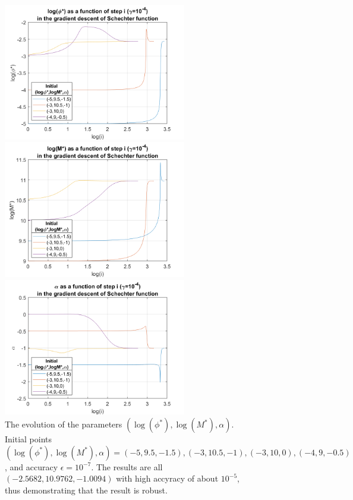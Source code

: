 \documentclass[12pt, graphicx]{article}
\begin{document}
\begin{figure}[ht]
\begin{minipage}{0.48\linewidth}
\centering
\includegraphics[width = 80mm]{phi.png}
\end{minipage}
\begin{minipage}{0.48\linewidth}
\centering
\includegraphics[width = 80mm]{m.png}
\end{minipage}
\centering
\begin{minipage}{0.48\linewidth}
\centering
\includegraphics[width = 80mm]{alpha.png}
\end{minipage}
\caption{The evolution of the parameters $(\log(\phi^*),\log(M^*),\alpha)$. Initial points $(\log(\phi^*),\log(M^*),\alpha)=(-5,9.5,-1.5),(-3,10.5,-1),(-3,10,0),(-4,9,-0.5)$, and accuracy $\epsilon=10^{-7}$. The results are all $(-2.5682,10.9762,-1.0094)$ with high accyracy of about $10^{-5}$, thus demonstrating that the result is robust.}
\label{fig:para}
\end{figure}
\end{document}
